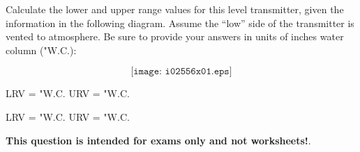 

Calculate the lower and upper range values for this level transmitter, given the information in the following diagram.  Assume the ``low'' side of the transmitter is vented to atmosphere.  Be sure to provide your answers in units of inches water column ("W.C.):

$$\texttt{[image: i02556x01.eps]}$$

LRV = \underbar{\hskip 50pt} "W.C. \hskip 100pt URV = \underbar{\hskip 50pt} "W.C.







LRV =  "W.C. \hskip 100pt URV =  "W.C.







{\bf This question is intended for exams only and not worksheets!}.




